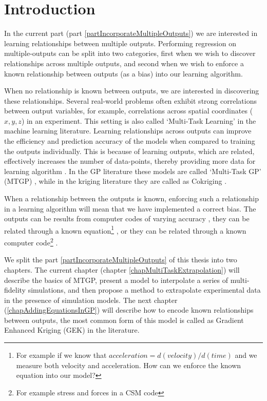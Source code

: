 
\section{Introduction}

In the current part (part \ref{partIncorporateMultipleOutputs}) we are interested in learning relationships between multiple outputs. Performing regression on multiple-outputs can be split into two categories, first when we wish to discover relationships across multiple outputs, and second when we wish to enforce a known relationship between outputs (as a bias) into our learning algorithm.

When no relationship is known between outputs, we are interested in discovering these relationships. Several real-world problems often exhibit strong correlations between output variables, for example, correlations across spatial coordinates ($x, y, z$) in an experiment. This setting is also called `Multi-Task Learning' in the machine learning literature. Learning relationships across outputs can improve the efficiency and prediction accuracy of the models when compared to training the outputs individually. This is because of learning outputs, which are related, effectively increases the number of data-points, thereby providing more data for learning algorithm  \cite{caruana1998multitask}. In the GP literature these models are called `Multi-Task GP' (MTGP) \cite{alvarez2011kernels, bonilla_multi-task_2008, Boyle05dependentgaussian}, while in the kriging literature they are called as Cokriging \cite{helterbrand1994universal, chiles1999geostatistics, ver1998constructing}.

\sloppy
When a relationship between the outputs is known, enforcing such a relationship in a learning algorithm will mean that we have implemented a correct bias. The outputs can be results from computer codes of varying accuracy \cite{kennedy2000predicting, forrester2007multi, le2013multi}, they can be related through a known equation\footnote{For example if we know that $acceleration = d(velocity)/d(time)$ and we measure both velocity and acceleration. How can we enforce the known equation into our model?} \cite{ginsbourger2013invariances, sarkka2011linear}, or they can be related through a known computer code\footnote{For example stress and forces in a CSM code} \cite{Constantinescu2013}. 

We split the part \ref{partIncorporateMultipleOutputs} of this thesis into two chapters. The current chapter (chapter \ref{chapMultiTaskExtrapolation}) will describe the basics of MTGP, present a model to interpolate a series of multi-fidelity simulations, and then propose a method to extrapolate experimental data in the presence of simulation models. The next chapter (\ref{chapAddingEquationsInGP}) will describe how to encode known relationships between outputs, the most common form of this model is called as Gradient Enhanced Kriging (GEK) in the literature. 

